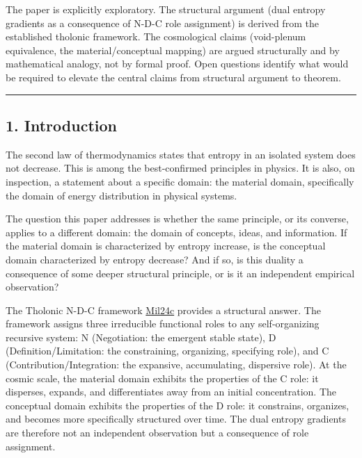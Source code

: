 \documentclass[
  11pt,
  letterpaper,
]{article}
\begin{document}
The paper is explicitly exploratory. The structural argument (dual
entropy gradients as a consequence of N-D-C role assignment) is derived
from the established tholonic framework. The cosmological claims
(void-plenum equivalence, the material/conceptual mapping) are argued
structurally and by mathematical analogy, not by formal proof. Open
questions identify what would be required to elevate the central claims
from structural argument to theorem.

\begin{center}\rule{0.5\linewidth}{0.5pt}\end{center}

\subsection{1. Introduction}\label{introduction}

The second law of thermodynamics states that entropy in an isolated
system does not decrease. This is among the best-confirmed principles in
physics. It is also, on inspection, a statement about a specific domain:
the material domain, specifically the domain of energy distribution in
physical systems.

The question this paper addresses is whether the same principle, or its
converse, applies to a different domain: the domain of concepts, ideas,
and information. If the material domain is characterized by entropy
increase, is the conceptual domain characterized by entropy decrease?
And if so, is this duality a consequence of some deeper structural
principle, or is it an independent empirical observation?

The Tholonic N-D-C framework
\href{https://github.com/baardev/truevalue/blob/main/docnav/Research/papers/3_minimal-recursive-triadic-framework/3_minimal-recursive-triadic-framework.pdf}{Mil24c}
provides a structural answer. The framework assigns three irreducible
functional roles to any self-organizing recursive system: N
(Negotiation: the emergent stable state), D (Definition/Limitation: the
constraining, organizing, specifying role), and C
(Contribution/Integration: the expansive, accumulating, dispersive
role). At the cosmic scale, the material domain exhibits the properties
of the C role: it disperses, expands, and differentiates away from an
initial concentration. The conceptual domain exhibits the properties of
the D role: it constrains, organizes, and becomes more specifically
structured over time. The dual entropy gradients are therefore not an
independent observation but a consequence of role assignment.
\end{document}
